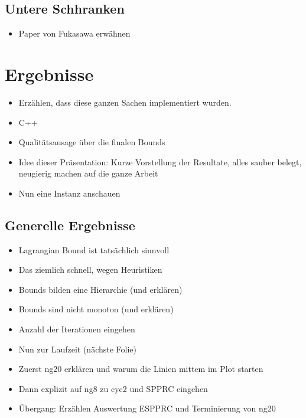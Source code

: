 \documentclass{article}
\begin{document}
\subsection*{Untere Schhranken}
\begin{itemize}
        \item Paper von Fukasawa erwähnen
\end{itemize}

\section*{Ergebnisse}
\begin{itemize}
    \item Erzählen, dass diese ganzen Sachen implementiert wurden.
    \item C++
    \item Qualitätsausage über die finalen Bounds
    \item Idee dieser Präsentation: Kurze Vorstellung der Resultate, alles sauber belegt, neugierig machen auf die ganze Arbeit
    \item Nun eine Instanz anschauen
\end{itemize}
\subsection*{Generelle Ergebnisse}
\begin{itemize}
    \item Lagrangian Bound ist tatsächlich sinnvoll
    \item Das ziemlich schnell, wegen Heuristiken
    \item Bounds bilden eine Hierarchie (und erklären)
    \item Bounds sind nicht monoton (und erklären)
    \item Anzahl der Iterationen eingehen
    \item Nun zur Laufzeit (nächste Folie)
    \item Zuerst ng20 erklären und warum die Linien mittem im Plot starten
    \item Dann explizit auf ng8 zu cyc2 und SPPRC eingehen
    \item Übergang: Erzählen Auswertung ESPPRC und Terminierung von ng20
\end{itemize}
\end{document}
